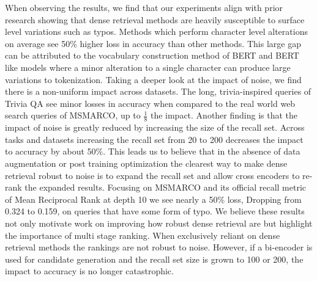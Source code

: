 \begin{table}[t!]
    \centering
    \caption{Retrieval accuracy (Acc) at K for Bi-encoders on unaltered and noisy queries. As recall set size grow, the impact of noise is greatly reduced. We find a large variation in impact of noise across datasets as the factoid queries from Trivia QA impacted $\frac{1}{5}$ to $\frac{1}{8}$ that of the web search queries of MS MARCO}
    \label{tab:bi-encoder-noise}
\end{table}
When observing the results, we find that our experiments align with prior research showing that dense retrieval methods are heavily susceptible to surface level variations such as typos. Methods which perform character level alterations on average see 50\% higher loss in accuracy than other methods. This large gap can be attributed to the vocabulary construction method of BERT and BERT like models where a minor alteration to a single character can produce large variations to tokenization. Taking a deeper look at the impact of noise, we find there is a non-uniform impact across datasets. The long, trivia-inspired queries of Trivia QA see minor losses in accuracy when compared to the real world web search queries of MSMARCO, up to $\frac{1}{8}$ the impact. Another finding is that the impact of noise is greatly reduced by increasing the size of the recall set. Across tasks and datasets increasing the recall set from 20 to 200 decreases the impact to accuracy by about 50\%. This leads us to believe that in the absence of data augmentation or post training optimization the clearest way to make dense retrieval robust to noise is to expand the recall set and allow cross encoders to re-rank the expanded results. Focusing on MSMARCO and its official recall metric of Mean Reciprocal Rank at depth 10 we see nearly a 50\% loss, Dropping from 0.324 to 0.159, on queries that have some form of typo. We believe these results not only motivate work on improving how robust dense retrieval are but highlight the importance of multi stage ranking. When exclusively reliant on dense retrieval methods the rankings are not robust to noise. However, if a bi-encoder is used for candidate generation and the recall set size is grown to 100 or 200, the impact to accuracy is no longer catastrophic.  
